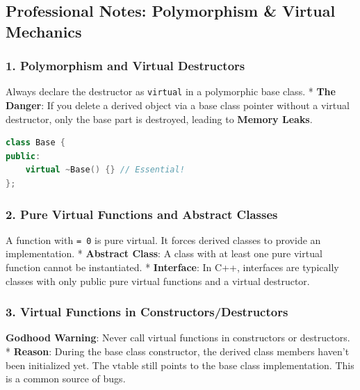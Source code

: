 \hypertarget{professional-notes-polymorphism-virtual-mechanics}{%
\subsection{Professional Notes: Polymorphism \& Virtual
Mechanics}\label{professional-notes-polymorphism-virtual-mechanics}}

\hypertarget{polymorphism-and-virtual-destructors}{%
\subsubsection{1. Polymorphism and Virtual
Destructors}\label{polymorphism-and-virtual-destructors}}

Always declare the destructor as \passthrough{\lstinline!virtual!} in a
polymorphic base class. * \textbf{The Danger}: If you delete a derived
object via a base class pointer without a virtual destructor, only the
base part is destroyed, leading to \textbf{Memory Leaks}.

\begin{lstlisting}[language={C++}]
class Base {
public:
    virtual ~Base() {} // Essential!
};
\end{lstlisting}

\hypertarget{pure-virtual-functions-and-abstract-classes}{%
\subsubsection{2. Pure Virtual Functions and Abstract
Classes}\label{pure-virtual-functions-and-abstract-classes}}

A function with \passthrough{\lstinline!= 0!} is pure virtual. It forces
derived classes to provide an implementation. * \textbf{Abstract Class}:
A class with at least one pure virtual function cannot be instantiated.
* \textbf{Interface}: In C++, interfaces are typically classes with only
public pure virtual functions and a virtual destructor.

\hypertarget{virtual-functions-in-constructorsdestructors}{%
\subsubsection{3. Virtual Functions in
Constructors/Destructors}\label{virtual-functions-in-constructorsdestructors}}

\textbf{Godhood Warning}: Never call virtual functions in constructors
or destructors. * \textbf{Reason}: During the base class constructor,
the derived class members haven't been initialized yet. The vtable still
points to the base class implementation. This is a common source of
bugs.

